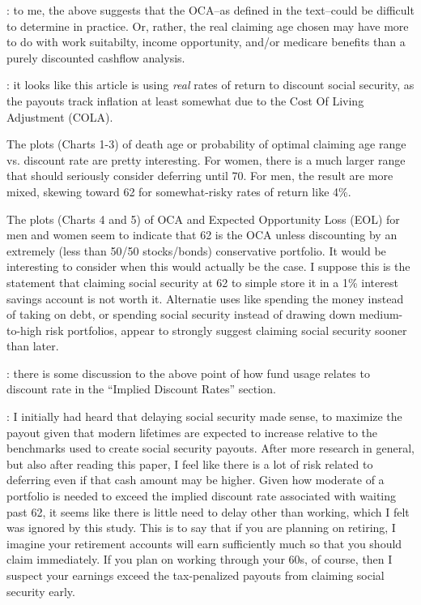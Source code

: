 \documentclass{article}
\begin{document}
\note{[Note]}: to me, the above suggests that the OCA--as defined in the text--could be difficult to determine in practice.  Or, rather, the real claiming age chosen may have more to do with work suitabilty, income opportunity, and/or medicare benefits than a purely discounted cashflow analysis.

\note{[Note]}: it looks like this article is using {\it real} rates of return to discount social security, as the payouts track inflation at least somewhat due to the Cost Of Living Adjustment (COLA).

The plots (Charts 1-3) of death age or probability of optimal claiming age range vs. discount rate are pretty interesting.  For women, there is a much larger range that should seriously consider deferring until 70.  For men, the result are more mixed, skewing toward 62 for somewhat-risky rates of return like 4\%.

The plots (Charts 4 and 5) of OCA and Expected Opportunity Loss (EOL) for men and women seem to indicate that 62 is the OCA unless discounting by an extremely (less than 50/50 stocks/bonds) conservative portfolio.  It would be interesting to consider when this would actually be the case.  I suppose this is the statement that claiming social security at 62 to simple store it in a 1\% interest savings account is not worth it.  Alternatie uses like spending the money instead of taking on debt, or spending social security instead of drawing down medium-to-high risk portfolios, appear to strongly suggest claiming social security sooner than later.

\note{[Note]}: there is some discussion to the above point of how fund usage relates to discount rate in the ``Implied Discount Rates'' section.


\note{[Takeaway]}: I initially had heard that delaying social security made sense, to maximize the payout given that modern lifetimes are expected to increase relative to the benchmarks used to create social security payouts.  After more research in general, but also after reading this paper, I feel like there is a lot of risk related to deferring even if that cash amount may be higher.  Given how moderate of a portfolio is needed to exceed the implied discount rate associated with waiting past 62, it seems like there is little need to delay other than working, which I felt was ignored by this study.  This is to say that if you are planning on retiring, I imagine your retirement accounts will earn sufficiently much so that you should claim immediately.  If you plan on working through your 60s, of course, then I suspect your earnings exceed the tax-penalized payouts from claiming social security early.
\end{document}
